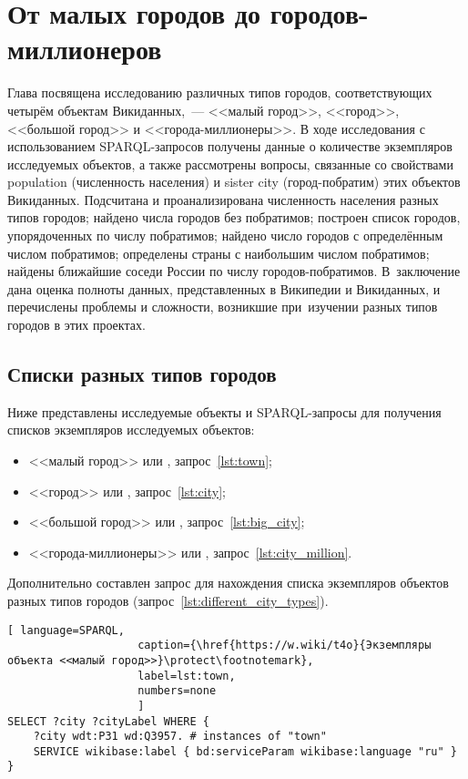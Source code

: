 \chapter{От малых городов до городов-миллионеров}
\label{ch:city}

Глава посвящена исследованию различных типов городов, 
соответствующих четырём объектам Викиданных,~--- 
<<малый город>>, <<город>>, <<большой город>> и <<города-миллионеры>>. 
В ходе исследования с использованием SPARQL-запросов получены данные 
о количестве экземпляров исследуемых объектов, а также рассмотрены вопросы, 
связанные со свойствами population (численность населения) и sister city (город-побратим) этих объектов Викиданных. 
Подсчитана и проанализирована численность населения разных типов городов; 
найдено числа городов без побратимов; построен список городов, упорядоченных по числу побратимов; 
найдено число городов с определённым числом побратимов; 
определены страны с наибольшим числом побратимов; 
найдены ближайшие соседи России по числу городов-побратимов. 
В~заключение дана оценка полноты данных, представленных в Википедии и Викиданных, 
и перечислены проблемы и сложности, возникшие при~изучении разных типов городов в этих проектах.
\section{Списки разных типов городов}

Ниже представлены исследуемые объекты и SPARQL-запросы для получения списков экземпляров исследуемых объектов: 
\begin{itemize}[leftmargin=24pt]
	\item <<малый город>> или , запрос~\ref{lst:town};
	\item <<город>> или , запрос~\ref{lst:city};
	\item <<большой город>> или , запрос~\ref{lst:big_city};
	\item <<города-миллионеры>> или , запрос~\ref{lst:city_million}.
\end{itemize}

Дополнительно составлен запрос для нахождения списка экземпляров объектов разных типов городов (запрос~\ref{lst:different_city_types}).

\begin{lstlisting}[ language=SPARQL, 
                    caption={\href{https://w.wiki/t4o}{Экземпляры объекта <<малый город>>}\protect\footnotemark},
                    label=lst:town, 
                    numbers=none
                    ]
SELECT ?city ?cityLabel WHERE {
	?city wdt:P31 wd:Q3957. # instances of "town"
	SERVICE wikibase:label { bd:serviceParam wikibase:language "ru" }
}
\end{lstlisting}

